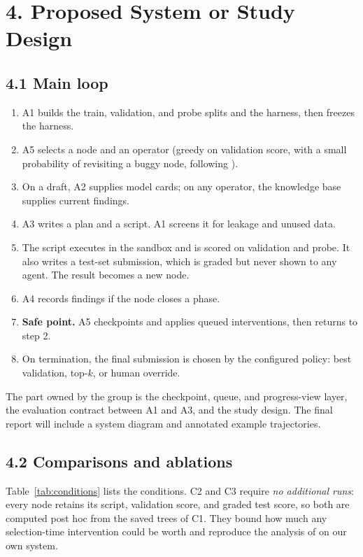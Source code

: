 \documentclass[11pt]{article}
\begin{document}
\section*{4. Proposed System or Study Design}

\subsection*{4.1 Main loop}

\begin{enumerate}[leftmargin=*,itemsep=0.1em]
    \item A1 builds the train, validation, and probe splits and the harness, then
          freezes the harness.
    \item A5 selects a node and an operator (greedy on validation score, with a small
          probability of revisiting a buggy node, following \cite{aide}).
    \item On a draft, A2 supplies model cards; on any operator, the knowledge base
          supplies current findings.
    \item A3 writes a plan and a script. A1 screens it for leakage and unused data.
    \item The script executes in the sandbox and is scored on validation and probe.
          It also writes a test-set submission, which is graded but never shown to
          any agent. The result becomes a new node.
    \item A4 records findings if the node closes a phase.
    \item \textbf{Safe point.} A5 checkpoints and applies queued interventions, then
          returns to step 2.
    \item On termination, the final submission is chosen by the configured policy:
          best validation, top-$k$, or human override.
\end{enumerate}

The part owned by the group is the checkpoint, queue, and progress-view layer, the
evaluation contract between A1 and A3, and the study design. The final report will
include a system diagram and annotated example trajectories.

\subsection*{4.2 Comparisons and ablations}

Table~\ref{tab:conditions} lists the conditions. C2 and C3 require \emph{no
additional runs}: every node retains its script, validation score, and graded test
score, so both are computed post hoc from the saved trees of C1. They bound how much
any selection-time intervention could be worth and reproduce the analysis of
\cite{aira} on our own system.
\end{document}
